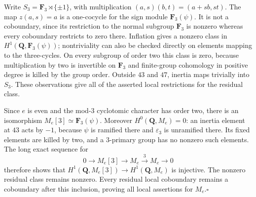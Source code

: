 \documentclass[11pt,a4paper]{article}
\theoremstyle{remark}
\begin{document}
Write $S_3=\mathbf F_3\rtimes\{\pm1\}$, with multiplication
$(a,s)(b,t)=(a+sb,st)$.  The map $z(a,s)=a$ is a one-cocycle for the
sign module $\mathbf F_3(\psi)$.  It is not a coboundary, since its
restriction to the normal subgroup $\mathbf F_3$ is nonzero whereas
every coboundary restricts to zero there.  Inflation gives a nonzero
class in $H^1(\mathbf Q,\mathbf F_3(\psi))$; nontriviality can also be
checked directly on elements mapping to the three-cycles.  On every
subgroup of order two this class is zero, because multiplication by two
is invertible on $\mathbf F_3$ and finite-group cohomology in positive
degree is killed by the group order.  Outside $43$ and $47$, inertia
maps trivially into $S_3$.  These observations give all of the asserted
local restrictions for the residual class.

Since $e$ is even and the mod-$3$ cyclotomic character has order two,
there is an isomorphism $M_e[3]\simeq\mathbf F_3(\psi)$.  Moreover
$H^0(\mathbf Q,M_e)=0$: an inertia element at $43$ acts by $-1$, because
$\psi$ is ramified there and $\varepsilon_3$ is unramified there.  Its
fixed elements are killed by two, and a $3$-primary group has no
nonzero such elements.  The long exact sequence for
\[
 0\longrightarrow M_e[3]\longrightarrow M_e
 \xrightarrow{\,3\,}M_e\longrightarrow0
\]
therefore shows that
$H^1(\mathbf Q,M_e[3])\longrightarrow H^1(\mathbf Q,M_e)$ is injective.
The nonzero residual class remains nonzero.  Every residual local
coboundary remains a coboundary after this inclusion, proving all
local assertions for $M_e$.\hfill$\square$
\end{document}
